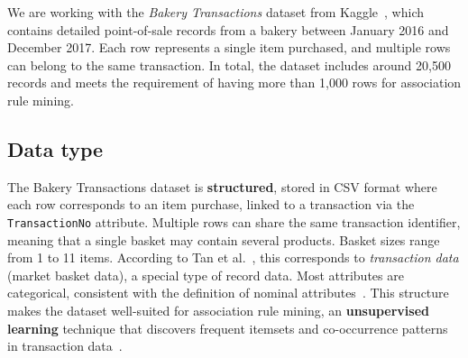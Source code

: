 \label{chap:data-understanding}

We are working with the \textit{Bakery Transactions} dataset from Kaggle~\cite{bakerydata}, 
which contains detailed point-of-sale records from a bakery between January 2016 and December 2017. 
Each row represents a single item purchased, and multiple rows can belong to the same transaction.  
In total, the dataset includes around 20,500 records and meets the requirement of having more than 
1,000 rows for association rule mining.  

\subsection*{Data type}
The Bakery Transactions dataset is \textbf{structured}, 
stored in CSV format where each row corresponds to an item purchase, 
linked to a transaction via the \texttt{TransactionNo} attribute.  
Multiple rows can share the same transaction identifier, meaning that a single 
basket may contain several products.  
Basket sizes range from 1 to 11 items. 
According to Tan et al.~\cite[Ch.~2, Sec.~2.1.2]{courseLitt}, 
this corresponds to \textit{transaction data} (market basket data), 
a special type of record data.  
Most attributes are categorical, consistent with the definition of nominal 
attributes~\cite[Ch.~2, Sec.~2.1.1]{courseLitt}.  
This structure makes the dataset well-suited for association rule mining, 
an \textbf{unsupervised learning} technique that discovers frequent itemsets 
and co-occurrence patterns in transaction data~\cite[Ch.~5, Sec.~5.1]{courseLitt}.


